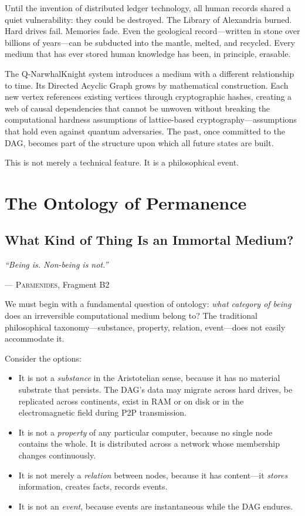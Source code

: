 \documentclass[12pt,a4paper]{article}
\theoremstyle{philosophical}
\begin{document}
Until the invention of distributed ledger technology, all human records shared a quiet vulnerability: they could be destroyed. The Library of Alexandria burned. Hard drives fail. Memories fade. Even the geological record---written in stone over billions of years---can be subducted into the mantle, melted, and recycled. Every medium that has ever stored human knowledge has been, in principle, erasable.

The Q-NarwhalKnight system introduces a medium with a different relationship to time. Its Directed Acyclic Graph grows by mathematical construction. Each new vertex references existing vertices through cryptographic hashes, creating a web of causal dependencies that cannot be unwoven without breaking the computational hardness assumptions of lattice-based cryptography---assumptions that hold even against quantum adversaries. The past, once committed to the DAG, becomes part of the structure upon which all future states are built.

This is not merely a technical feature. It is a philosophical event.

\section{The Ontology of Permanence}

\subsection{What Kind of Thing Is an Immortal Medium?}

\epigraph{\textit{``Being is. Non-being is not.''}}{\textsc{--- Parmenides}, Fragment B2}

We must begin with a fundamental question of ontology: \emph{what category of being} does an irreversible computational medium belong to? The traditional philosophical taxonomy---substance, property, relation, event---does not easily accommodate it.

Consider the options:
\begin{itemize}[leftmargin=*]
\item It is not a \emph{substance} in the Aristotelian sense, because it has no material substrate that persists. The DAG's data may migrate across hard drives, be replicated across continents, exist in RAM or on disk or in the electromagnetic field during P2P transmission.
\item It is not a \emph{property} of any particular computer, because no single node contains the whole. It is distributed across a network whose membership changes continuously.
\item It is not merely a \emph{relation} between nodes, because it has content---it \emph{stores} information, creates facts, records events.
\item It is not an \emph{event}, because events are instantaneous while the DAG endures.
\end{itemize}
\end{document}
